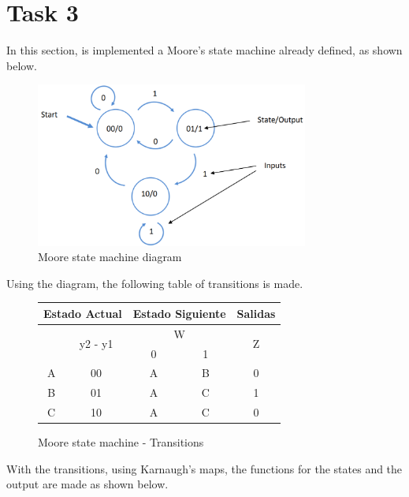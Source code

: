 



\section*{Task 3}

In this section, is implemented a Moore's state
machine already defined, as shown below.

\begin{figure}[H]
    \begin{centering}
    \includegraphics[width=0.8\textwidth]{Graficos3/3a_fsm.png}
    \par\end{centering}
    \caption{Moore state machine diagram}
\end{figure}

Using the diagram, the following table of transitions 
is made.

\begin{figure}[H]
\begin{center}
\begin{tabular}{|c|c|c|c||c|}
    \hline 
    \multicolumn{2}{|c|}{Estado Actual} & \multicolumn{2}{c||}{Estado Siguiente} & \multicolumn{1}{c|}{Salidas}\tabularnewline
    \hline 
    \hline 
    \multirow{2}{*}{} & \multirow{2}{*}{y2 - y1} & \multicolumn{2}{c||}{W} & \multirow{2}{*}{Z}\tabularnewline
    \cline{3-4} 
     &  & \multicolumn{1}{c|}{0} & \multicolumn{1}{c||}{1} & \tabularnewline
    \hline 
    A & 00 & A & B & 0\tabularnewline
    \hline 
    B & 01 & A & C & 1\tabularnewline
    \hline 
    C & 10 & A & C & 0\tabularnewline
    \hline 
    \end{tabular}
    \caption{Moore state machine - Transitions}
\end{center}
\end{figure}
With the transitions, using Karnaugh's maps, the 
functions for the states and the output are made
as shown below.

